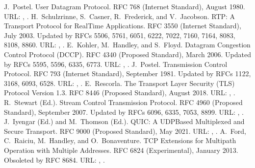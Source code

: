 \documentclass[letterpaper,10pt,english]{sphinxmanual}
\begin{document}
\begin{sphinxthebibliography}{10}
\sphinxAtStartPar
J. Postel. User Datagram Protocol. RFC 768 (Internet Standard), August 1980. URL: , .
\sphinxAtStartPar
H. Schulzrinne, S. Casner, R. Frederick, and V. Jacobson. RTP: A Transport Protocol for Real\sphinxhyphen{}Time Applications. RFC 3550 (Internet Standard), July 2003. Updated by RFCs 5506, 5761, 6051, 6222, 7022, 7160, 7164, 8083, 8108, 8860. URL: , .
\sphinxAtStartPar
E. Kohler, M. Handley, and S. Floyd. Datagram Congestion Control Protocol (DCCP). RFC 4340 (Proposed Standard), March 2006. Updated by RFCs 5595, 5596, 6335, 6773. URL: , .
\sphinxAtStartPar
J. Postel. Transmission Control Protocol. RFC 793 (Internet Standard), September 1981. Updated by RFCs 1122, 3168, 6093, 6528. URL: , .
\sphinxAtStartPar
E. Rescorla. The Transport Layer Security (TLS) Protocol Version 1.3. RFC 8446 (Proposed Standard), August 2018. URL: , .
\sphinxAtStartPar
R. Stewart (Ed.). Stream Control Transmission Protocol. RFC 4960 (Proposed Standard), September 2007. Updated by RFCs 6096, 6335, 7053, 8899. URL: , .
\sphinxAtStartPar
J. Iyengar (Ed.) and M. Thomson (Ed.). QUIC: A UDP\sphinxhyphen{}Based Multiplexed and Secure Transport. RFC 9000 (Proposed Standard), May 2021. URL: , .
\sphinxAtStartPar
A. Ford, C. Raiciu, M. Handley, and O. Bonaventure. TCP Extensions for Multipath Operation with Multiple Addresses. RFC 6824 (Experimental), January 2013. Obsoleted by RFC 8684. URL: , .

\end{sphinxthebibliography}
\end{document}
